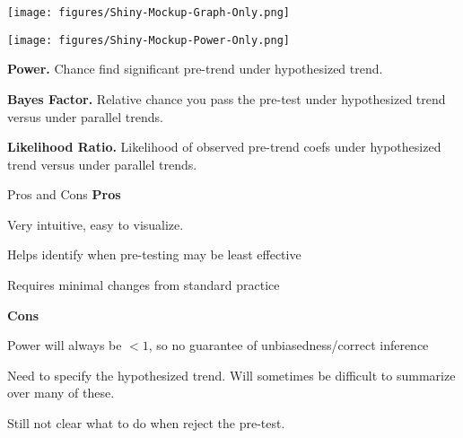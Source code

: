 \documentclass[aspectratio = 169, 13pt]{beamer}
\begin{document}
\begin{frame}
	\centering
	\texttt{[image: figures/Shiny-Mockup-Graph-Only.png]}   
\end{frame}

\begin{frame}
	\centering
	\texttt{[image: figures/Shiny-Mockup-Power-Only.png]} 
	\begin{wideitemize}
		\item
		\textbf{Power.} Chance find significant pre-trend under hypothesized trend.
		\item
		\textbf{Bayes Factor.} Relative chance you pass the pre-test under hypothesized trend versus under parallel trends.
		\item
		\textbf{Likelihood Ratio.} Likelihood of observed pre-trend coefs under hypothesized trend versus under parallel trends.
	\end{wideitemize}
\end{frame}

\begin{frame}{Pros and Cons}
	\textbf{Pros}
	\begin{wideitemize}
		\item
		Very intuitive, easy to visualize.
		
		\item
		Helps identify when pre-testing may be least effective
		
		\item
		Requires minimal changes from standard practice
	\end{wideitemize}
	
	\textbf{Cons}
	
	\begin{wideitemize}
		\item
		Power will always be $<1$, so no guarantee of unbiasedness/correct inference
		
		\item
		Need to specify the hypothesized trend. Will sometimes be difficult to summarize over many of these.
		
		\item
		Still not clear what to do when reject the pre-test.
	\end{wideitemize}
	
\end{frame}
\end{document}
